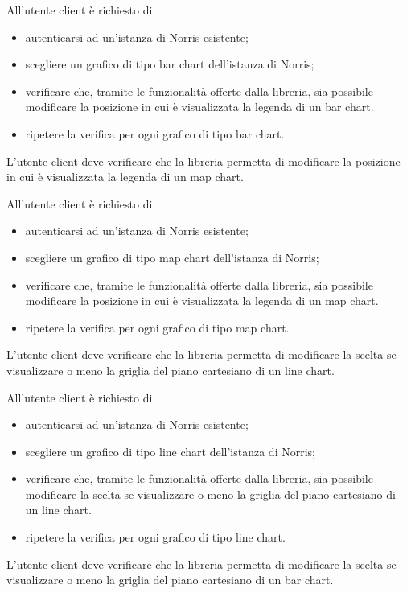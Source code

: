 		All'utente client è richiesto di
		\begin{itemize}
			\item autenticarsi ad un'istanza di Norris esistente;
			\item scegliere un grafico di tipo bar chart dell'istanza di Norris;
			\item verificare che, tramite le funzionalità offerte dalla libreria, sia possibile modificare la posizione in cui è visualizzata la legenda di un bar chart.
			\item ripetere la verifica per ogni grafico di tipo bar chart.
		\end{itemize}

	L'utente client deve verificare che la libreria permetta di modificare la posizione in cui è visualizzata la legenda di un map chart.
		
		All'utente client è richiesto di
		\begin{itemize}
			\item autenticarsi ad un'istanza di Norris esistente;
			\item scegliere un grafico di tipo map chart dell'istanza di Norris;
			\item verificare che, tramite le funzionalità offerte dalla libreria, sia possibile modificare la posizione in cui è visualizzata la legenda di un map chart.
			\item ripetere la verifica per ogni grafico di tipo map chart.
		\end{itemize}

	L'utente client deve verificare che la libreria permetta di modificare la scelta se visualizzare o meno la griglia del piano cartesiano di un line chart.
		
		All'utente client è richiesto di
		\begin{itemize}
			\item autenticarsi ad un'istanza di Norris esistente;
			\item scegliere un grafico di tipo line chart dell'istanza di Norris;
			\item verificare che, tramite le funzionalità offerte dalla libreria, sia possibile modificare la scelta se visualizzare o meno la griglia del piano cartesiano di un line chart.
			\item ripetere la verifica per ogni grafico di tipo line chart.
		\end{itemize}

	L'utente client deve verificare che la libreria permetta di modificare la scelta se visualizzare o meno la griglia del piano cartesiano di un bar chart.
		
